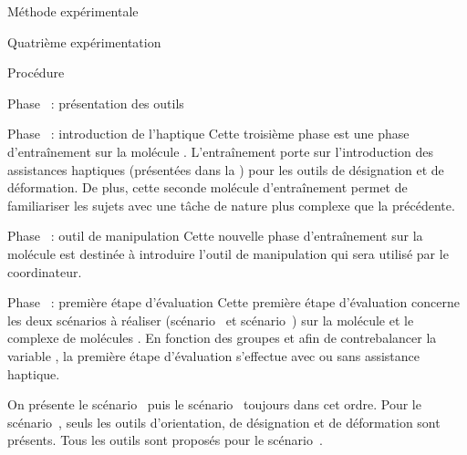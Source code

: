 \documentclass[myfrancais,ngerman,english,french]{mythesis}
\begin{document}
\begin{mychapter}{Méthode expérimentale}
\begin{mysection}{Quatrième expérimentation}
\begin{mysubsection}{Procédure}
\begin{myparagraph}{Phase~ : présentation des outils}
				\end{myparagraph}
				\begin{myparagraph}{Phase~ : introduction de l'haptique}
					Cette troisième phase est une phase d'entraînement sur la molécule \myPrion.
					L'entraînement porte sur l'introduction des assistances haptiques (présentées dans la ) pour les outils de désignation et de déformation.
					De plus, cette seconde molécule d'entraînement permet de familiariser les sujets avec une tâche de nature plus complexe que la précédente.
				\end{myparagraph}
				\begin{myparagraph}{Phase~ : outil de manipulation}
					Cette nouvelle phase d'entraînement sur la molécule \myTRPZIPPER est destinée à introduire l'outil de manipulation qui sera utilisé par le coordinateur.
				\end{myparagraph}
				\begin{myparagraph}{Phase~ : première étape d'évaluation}
					Cette première étape d'évaluation concerne les deux scénarios à réaliser (scénario~ et scénario~) sur la molécule \myUbiquitin et le complexe de molécules \myNusENusG.
					En fonction des groupes et afin de contrebalancer la variable , la première étape d'évaluation s'effectue avec ou sans assistance haptique.

					On présente le scénario~ puis le scénario~ toujours dans cet ordre.
					Pour le scénario~, seuls les outils d'orientation, de désignation et de déformation sont présents.
					Tous les outils sont proposés pour le scénario~.


\end{myparagraph}
\end{mysubsection}
\end{mysection}
\end{mychapter}
\end{document}
